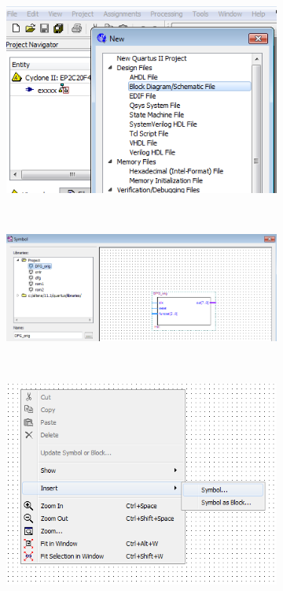 \documentclass[12pt, logo=tehranDLDL/ut]{tehranDLDL}
\begin{document}
\begin{figure}
    \centering
    \caption{Quartus~II}
    \begin{subfigure}{0.3\textwidth}
        \includegraphics[width=\textwidth]{QuartusII1}
    \end{subfigure}
    ~
    \begin{subfigure}{0.3\textwidth}
        \includegraphics[width=\textwidth]{QuartusII2}
    \end{subfigure}
    ~
    \begin{subfigure}{0.3\textwidth}
        \includegraphics[width=\textwidth]{QuartusII3}
    \end{subfigure}
\end{figure}
\end{document}

